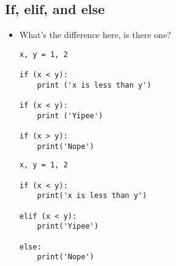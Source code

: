 \documentclass[11pt]{article}
\begin{document}
\subsection{If, elif, and else}
\label{sec:org3cf5de3}
\begin{itemize}
\item What's the difference here, is there one?
\begin{verbatim}
x, y = 1, 2

if (x < y):
    print ('x is less than y')

if (x < y):
    print ('Yipee')

if (x > y):
    print('Nope')
\end{verbatim}
\begin{verbatim}
x, y = 1, 2

if (x < y):
    print('x is less than y')

elif (x < y):
    print('Yipee')

else:
    print('Nope')
\end{verbatim}
\end{itemize}
\end{document}

